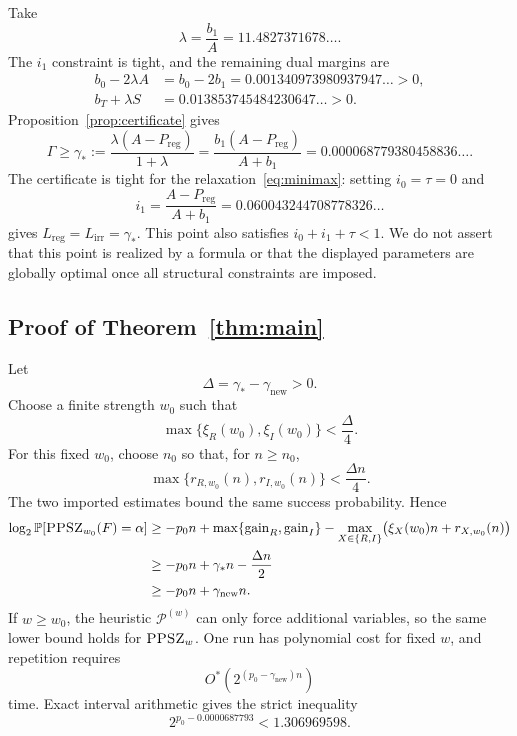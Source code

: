 \documentclass[11pt]{article}
\newcommand{\PPSZ}{\textnormal{\textsc{PPSZ}}}
\newcommand{\gain}{\mathrm{gain}}
\newcommand{\Lreg}{L_{\mathrm{reg}}}
\newcommand{\Lirr}{L_{\mathrm{irr}}}
\newcommand{\Preg}{P_{\mathrm{reg}}}
\newcommand{\Prb}{\mathbb P}
\begin{document}
Take
\begin{equation}\label{eq:lambdadef}
 \lambda=\frac{b_1}{A}=11.4827371678\ldots.
\end{equation}
The $i_1$ constraint is tight, and the remaining dual margins are
\begin{align}
 b_0-2\lambda A
 &=b_0-2b_1
 =0.001340973980937947\ldots>0,
 \label{eq:cert1}\\
 b_T+\lambda S
 &=0.013853745484230647\ldots>0.
 \label{eq:cert2}
\end{align}
Proposition~\ref{prop:certificate} gives
\begin{equation}\label{eq:gamma-star}
 \Gamma\ge
 \gamma_*
 :=\frac{\lambda(A-\Preg)}{1+\lambda}
 =\frac{b_1(A-\Preg)}{A+b_1}
 =0.000068779380458836\ldots.
\end{equation}
The certificate is tight for the relaxation~\eqref{eq:minimax}: setting $i_0=\tau=0$ and
\begin{equation}\label{eq:tight-point}
 i_1=\frac{A-\Preg}{A+b_1}
 =0.060043244708778326\ldots
\end{equation}
gives $\Lreg=\Lirr=\gamma_*$.  This point also satisfies $i_0+i_1+\tau<1$.  We do not assert that this point is realized by a formula or that the displayed parameters are globally optimal once all structural constraints are imposed.

\subsection{Proof of Theorem~\ref{thm:main}}

Let
\[
 \Delta=\gamma_*-\gamma_{\mathrm{new}}>0.
\]
Choose a finite strength $w_0$ such that
\[
 \max\{\xi_R(w_0),\xi_I(w_0)\}<\frac{\Delta}{4}.
\]
For this fixed $w_0$, choose $n_0$ so that, for $n\ge n_0$,
\[
 \max\{r_{R,w_0}(n),r_{I,w_0}(n)\}<\frac{\Delta n}{4}.
\]
The two imported estimates bound the same success probability.  Hence
\begin{align*}
 \log_2\Prb[\PPSZ_{w_0}(F)=\alpha]
 &\ge
 -p_0n+
 \max\{\gain_R,\gain_I\}
 -\max_{X\in\{R,I\}}\bigl(\xi_X(w_0)n+r_{X,w_0}(n)\bigr)\\
 &\ge
 -p_0n+\gamma_*n-\frac{\Delta n}{2}\\
 &\ge
 -p_0n+\gamma_{\mathrm{new}}n.
\end{align*}
If $w\ge w_0$, the heuristic $\mathcal P^{(w)}$ can only force additional variables, so the same lower bound holds for $\PPSZ_w$.  One run has polynomial cost for fixed $w$, and repetition requires
\[
 O^*\!\left(2^{(p_0-\gamma_{\mathrm{new}})n}\right)
\]
time.  Exact interval arithmetic gives the strict inequality
\[
 2^{p_0-0.0000687793}
 <1.306969598.
\]
\end{document}
